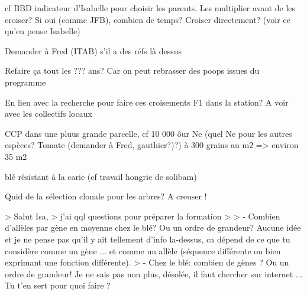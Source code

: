 cf BBD indicateur d'Isabelle pour choisir les parents. Les multiplier avant de les croiser? Si oui (comme JFB), combien de temps? Croiser directement? (voir ce qu'en pense Isabelle)

Demander à Fred (ITAB) s'il a des réfs là dessus

Refaire ça tout les ??? ans? Car on peut rebrasser des poops issues du programme

En lien avec la recherche pour faire ces croisements
F1 dans la station? A voir avec les collectifs locaux

CCP dans une pluus grande parcelle, cf 10 000 ôur Ne (quel Ne pour les autres espèces? Tomate (demander à Fred, gauthier?)?) à 300 grains au m2 => environ 35 m2


blé résistant à la carie (cf travail hongrie de solibam)

Quid de la sélection clonale pour les arbres? A creuser !

> Salut Isa,
> j'ai qql questions pour préparer la formation
>
> - Combien d'allèles par gène en moyenne chez le blé? Ou un ordre de grandeur?
Aucune idée et je ne pense pas qu'il y ait tellement d'info la-dessus, ca dépend de ce que
tu considère comme un gène ... et comme un allèle (séquence différente ou bien exprimant
une fonction différente).
> - Chez le blé: combien de gènes ? Ou un ordre de grandeur!
Je ne sais pas non plus, désolée, il faut chercher sur internet ...
Tu t'en sert pour quoi faire ?






